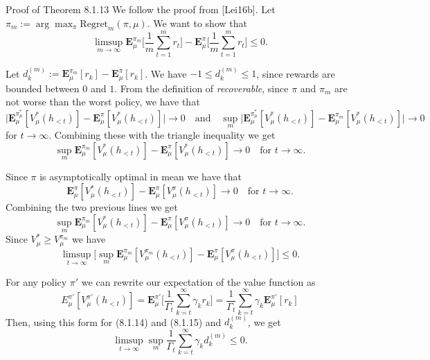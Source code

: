 \documentclass[aspectratio=169,10pt]{beamer}
\begin{document}
\begin{frame}[allowframebreaks]{Proof of Theorem 8.1.13}
  We follow the proof from [Lei16b]. Let $\pi_m := \arg\max_\pi
  \mathrm{Regret}_m(\pi,\mu)$. We want to show that
  $$\limsup_{m\to\infty}\mathbf{E}_\mu^{\pi_m}\Big[\frac1m\sum_{t=1}^m r_t\Big]
  - \mathbf{E}_\mu^\pi\Big[\frac1m\sum_{t=1}^m r_t\Big] \le 0.$$

  Let $d_k^{(m)} := \mathbf{E}_\mu^{\pi_m}[r_k] - \mathbf{E}_\mu^\pi[r_k]$.
  We have $-1\le d_k^{(m)}\le 1$, since rewards are bounded between $0$ and
  $1$. From the definition of \emph{recoverable}, since $\pi$ and $\pi_m$
  are not worse than the worst policy, we have that
  $$\Big|\mathbf{E}_\mu^{\pi_\mu^*}[V_\mu^*(h_{<t})] - \mathbf{E}_\mu^\pi[V_\mu^*(h_{<t})]\Big| \to 0
  \quad\text{and}\quad
  \sup_m\Big|\mathbf{E}_\mu^{\pi_\mu^*}[V_\mu^*(h_{<t})] - \mathbf{E}_\mu^{\pi_m}[V_\mu^*(h_{<t})]\Big| \to 0$$
  for $t\to\infty$. Combining these with the triangle inequality we get
  \begin{equation*}
  \sup_m \mathbf{E}_\mu^{\pi_m}[V_\mu^*(h_{<t})] - \mathbf{E}_\mu^\pi[V_\mu^*(h_{<t})] \to 0
  \quad \text{for } t\to\infty. \tag{8.1.14}
  \end{equation*}

  Since $\pi$ is asymptotically optimal in mean we have that
  $$\mathbf{E}_\mu^\pi[V_\mu^*(h_{<t})] - \mathbf{E}_\mu^\pi[V_\mu^\pi(h_{<t})] \to 0 \quad \text{for } t\to\infty.$$
  Combining the two previous lines we get
  $$\sup_m \mathbf{E}_\mu^{\pi_m}[V_\mu^*(h_{<t})] - \mathbf{E}_\mu^\pi[V_\mu^\pi(h_{<t})] \to 0 \quad \text{for } t\to\infty.$$
  Since $V_\mu^* \ge V_\mu^{\pi_m}$ we have
  \begin{equation*}
  \limsup_{t\to\infty}\Big[\sup_m \mathbf{E}_\mu^{\pi_m}[V_\mu^{\pi_m}(h_{<t})] - \mathbf{E}_\mu^\pi[V_\mu^\pi(h_{<t})]\Big] \le 0. \tag{8.1.15}
  \end{equation*}

  \framebreak

  For any policy $\pi'$ we can rewrite our expectation of the value function as
  $$E_\mu^{\pi'}[V_\mu^{\pi'}(h_{<t})] = \mathbf{E}_\mu^{\pi'}\Big[\frac1{\Gamma_t}\sum_{k=t}^\infty \gamma_k r_k\Big]
  = \frac1{\Gamma_t}\sum_{k=t}^\infty \gamma_k \mathbf{E}_\mu^{\pi'}[r_k]$$
  Then, using this form for (8.1.14) and (8.1.15) and $d_k^{(m)}$, we get
  $$\limsup_{t\to\infty}\sup_m \frac1{\Gamma_t}\sum_{k=t}^\infty \gamma_k d_k^{(m)} \le 0.$$


\end{frame}
\end{document}
